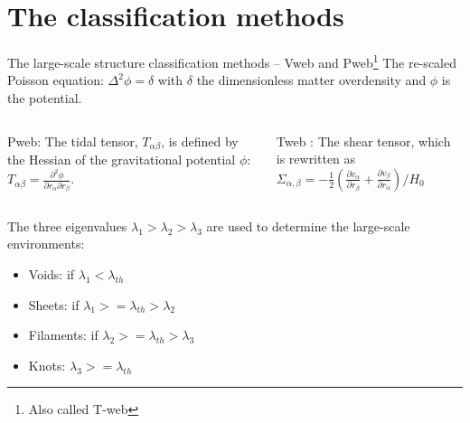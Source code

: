 \documentclass[aspectratio=43]{beamer}
\begin{document}
\section{The classification methods}
\begin{frame}{The large-scale structure classification methods -- Vweb and Pweb\footnote{Also called T-web}}
The re-scaled Poisson equation: $\Delta^2 \phi = \delta$ with $\delta$ the dimensionless matter overdensity and $\phi$ is the potential.
\vspace{-0.6cm}
  \begin{columns}[t]
    \begin{column}{0.49\textwidth}
      \begin{block}{Pweb:}
      The tidal tensor, $T_{\alpha\beta}$, is defined by the Hessian of the
gravitational potential $\phi$:
     $T_{\alpha\beta} = \frac{\partial^2\phi}{\partial r_{\alpha} \partial r_{\beta}}.$
      \end{block}
    \end{column}
    \begin{column}{0.49\textwidth}
      \begin{block}{Tweb :}
    The shear tensor, which is rewritten as
    $\Sigma_{\alpha, \beta} = -\frac{1}{2}(\frac{\partial v_{\alpha}}{\partial r_{\beta}} + \frac{\partial v_{\beta}}{\partial r_{\alpha}})/H_0$ 
      \end{block}
    \end{column}
  \end{columns}
 The three eigenvalues $\lambda_1 > \lambda_2 > \lambda_3$ are used to determine the large-scale environments:
 \begin{itemize}
     \item Voids: if $\lambda_1 < \lambda_{th}$
     \item Sheets: if $\lambda_1 >= \lambda_{th} > \lambda_2$
     \item Filaments: if $\lambda_2 >= \lambda_{th} > \lambda_3$
     \item Knots: $\lambda_3 >= \lambda_{th}$
 \end{itemize}
\end{frame}
\end{document}
